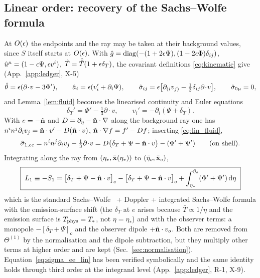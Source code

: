 \subsection{Linear order: recovery of the Sachs--Wolfe formula}
\label{sec:linearS}
At $O(\epsilon)$ the endpoints and the ray may be taken at their background values, since $S$ itself starts at
$O(\epsilon)$.  With $\hat g=\mathrm{diag}(-(1+2\epsilon\Psi),(1-2\epsilon\Phi)\delta_{ij})$, $\hat u^\mu=(1-\epsilon\Psi,\epsilon v^i)$,
$\hat T=\hat{\bar T}(1+\epsilon\delta_T)$, the covariant definitions \eqref{eq:kinematic} give (App.~\ref{app:ledger}, X-5)
\begin{equation}
\hat\theta=\epsilon(\partial\!\cdot\!v-3\Phi'),\qquad \hat a_i=\epsilon(v_i'+\partial_i\Psi),\qquad
\hat\sigma_{ij}=\epsilon\big[\partial_{(i}v_{j)}-\tfrac13\delta_{ij}\partial\!\cdot\!v\big],\qquad \hat\sigma_{0\mu}=0,
\label{eq:lin_kin}
\end{equation}
and Lemma~\ref{lem:fluid} becomes the linearised continuity and Euler equations
\begin{equation}
\delta_T'=\Phi'-\tfrac13\partial\!\cdot\!v,\qquad v_i'=-\partial_i(\Psi+\delta_T).
\label{eq:lin_fluid}
\end{equation}
With $e=-\hat{\mathbf n}$ and $D=\partial_\eta-\hat{\mathbf n}\cdot\nabla$ along the background ray one has
$n^in^j\partial_iv_j=\hat{\mathbf n}\cdot v'-D(\hat{\mathbf n}\cdot v)$, $\hat{\mathbf n}\cdot\nabla f=f'-Df$; inserting \eqref{eq:lin_fluid},
\begin{equation}
\hat\sigma_{1,ee}=n^in^j\partial_iv_j-\tfrac13\partial\!\cdot\!v
= D\big(\delta_T+\Psi-\hat{\mathbf n}\cdot v\big)-(\Phi'+\Psi')\qquad\text{(on shell)}.
\label{eq:sigma_ee_lin}
\end{equation}
Integrating along the ray from $(\eta_*,\bar{\mathbf x}(\eta_*))$ to $(\bar\eta_o,\bar{\mathbf x}_o)$,
\begin{equation}
\boxed{\;L_1\equiv-S_1=\big[\delta_T+\Psi-\hat{\mathbf n}\cdot v\big]_{e}-\big[\delta_T+\Psi-\hat{\mathbf n}\cdot v\big]_{o}
+\int_{\eta_*}^{\bar\eta_o}(\Phi'+\Psi')\,\mathrm d\eta\;}
\label{eq:L1}
\end{equation}
which is the standard Sachs--Wolfe~\cite{SW67} + Doppler + integrated Sachs--Wolfe formula with the
emission-surface shift (the $\delta_T$ at $e$ arises because $\bar T\propto1/\eta$ and the emission surface
is $T_{\rm phys}=T_*$, not $\eta=\eta_*$) and with the observer terms: a monopole $-[\delta_T+\Psi]_o$ and the
observer dipole $+\hat{\mathbf n}\cdot v_o$.  Both are removed from $\Theta^{(1)}$ by the normalisation and the dipole
subtraction, but they multiply other terms at higher order and are kept (Sec.~\ref{sec:normalisation}).
Equation~\eqref{eq:sigma_ee_lin} has been verified symbolically and the same identity holds through third
order at the integrand level (App.~\ref{app:ledger}, R-1, X-9).

